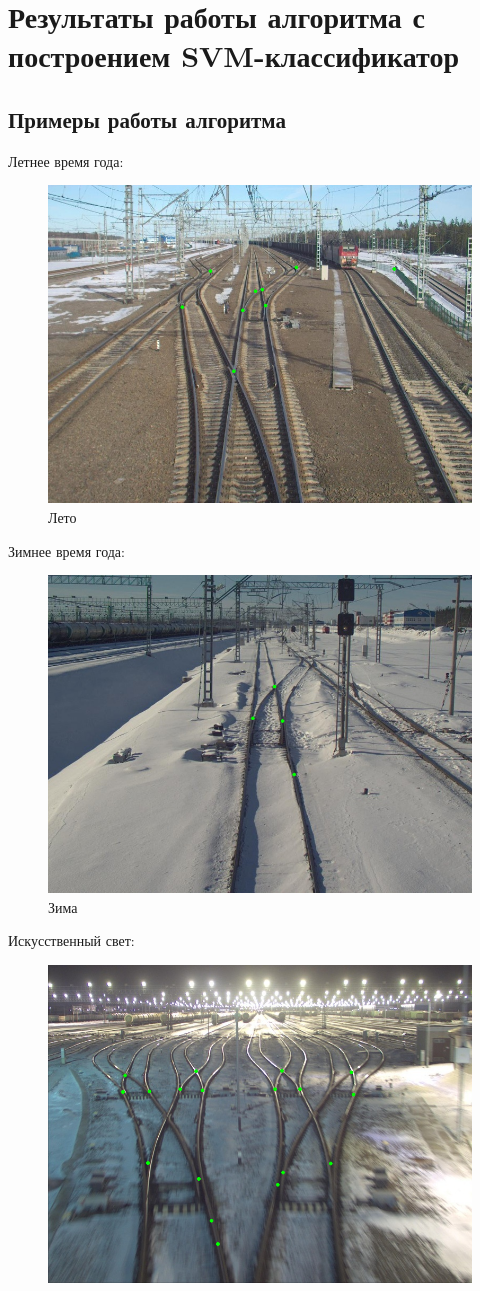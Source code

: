 \section{Результаты работы алгоритма с построением SVM-классификатор}
\subsection{Примеры работы алгоритма}
Летнее время года:
\begin{figure}[!h]
	\centering
	\includegraphics[width=0.7\linewidth]{pictures/103.png}
	\caption[Лето]{Лето}
	\label{fig:103}
\end{figure}
\newpage
Зимнее время года:
\begin{figure}[!h]
	\centering
	\includegraphics[width=0.7\linewidth]{pictures/146.png}
	\caption[Зима]{Зима}
	\label{fig:105}
\end{figure}
\newline
Искусственный свет:
\begin{figure}[!h]
	\centering
	\includegraphics[width=0.7\linewidth]{pictures/isk.png}
	\caption[Искусственное освещение]{}
	\label{fig:isk}
\end{figure}

